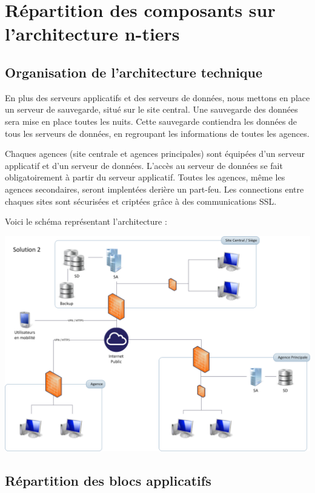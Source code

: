 
\section{Répartition des composants sur l'architecture n-tiers}

\subsection{Organisation de l'architecture technique}

En plus des serveurs applicatifs et des serveurs de données, nous mettons en place un serveur de sauvegarde, situé sur le site central. Une sauvegarde des données sera mise en place toutes les nuits. Cette sauvegarde contiendra les données de tous les serveurs de données, en regroupant les informations de toutes les agences.

Chaques agences (site centrale et agences principales) sont équipées d'un serveur applicatif et d'un serveur de données. L'accès au serveur de données se fait obligatoirement à partir du serveur applicatif. Toutes les agences, même les agences secondaires, seront implentées derière un part-feu. Les connections entre chaques sites sont sécurisées et criptées grâce à des communications SSL. 

Voici le schéma représentant l'architecture :

\begin {center}
\includegraphics[width=\textwidth]{Arch2Heberge.png}
\end {center}

\subsection{Répartition des blocs applicatifs}

